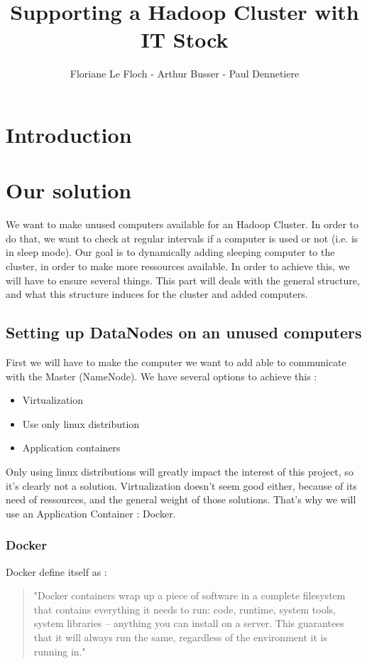 \documentclass[11pt]{report} %
\title{Supporting a Hadoop Cluster with IT Stock}
\author{Floriane Le Floch - Arthur Busser - Paul Dennetiere}
\begin{document}
\maketitle
\renewcommand{\contentsname}{Summary}
\newpage
\tableofcontents
\newpage

\part{Introduction}
\part{Our solution}
We want to make unused computers available for an Hadoop Cluster. In order to do that, we want to check at regular intervals if a computer is used or not (i.e. is in sleep mode). Our goal is to dynamically adding sleeping computer to the cluster, in order to make more ressources available.
In order to achieve this, we will have to ensure several things. This part will deals with the general structure, and what this structure induces for the cluster and added computers.
\chapter{Setting up DataNodes on an unused computers}
First we will have to make the computer we want to add able to communicate with the Master (NameNode). We have several options to achieve this : \begin{itemize}
\item Virtualization
\item Use only linux distribution
\item Application containers
\end{itemize}
Only using linux distributions will greatly impact the interest of this project, so it's clearly not a solution. Virtualization doesn't seem good either, because of its need of ressources, and the general weight of those solutions. That's why we will use an Application Container : Docker.
\section{Docker}
Docker define itself as : \begin{quote}"Docker containers wrap up a piece of software in a complete filesystem that contains everything it needs to run: code, runtime, system tools, system libraries – anything you can install on a server. This guarantees that it will always run the same, regardless of the environment it is running in."\end{quote}
\end{document}
